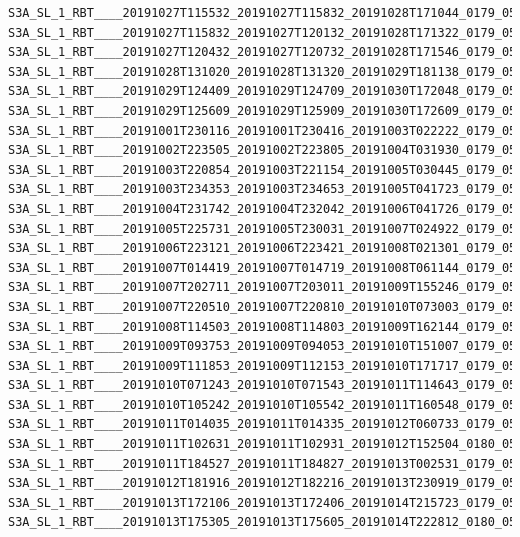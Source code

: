 \documentclass[sigplan,screen]{acmart}
\begin{document}
\begin{verbatim}
S3A_SL_1_RBT____20191027T115532_20191027T115832_20191028T171044_0179_051_009_1800_LN2_O_NT_003.hdf
S3A_SL_1_RBT____20191027T115832_20191027T120132_20191028T171322_0179_051_009_1980_LN2_O_NT_003.hdf
S3A_SL_1_RBT____20191027T120432_20191027T120732_20191028T171546_0179_051_009_2340_LN2_O_NT_003.hdf
S3A_SL_1_RBT____20191028T131020_20191028T131320_20191029T181138_0179_051_024_1800_LN2_O_NT_003.hdf
S3A_SL_1_RBT____20191029T124409_20191029T124709_20191030T172048_0179_051_038_1800_LN2_O_NT_003.hdf
S3A_SL_1_RBT____20191029T125609_20191029T125909_20191030T172609_0179_051_038_2520_LN2_O_NT_003.hdf
S3A_SL_1_RBT____20191001T230116_20191001T230416_20191003T022222_0179_050_030_0900_LN2_O_NT_003.hdf
S3A_SL_1_RBT____20191002T223505_20191002T223805_20191004T031930_0179_050_044_0900_LN2_O_NT_003.hdf
S3A_SL_1_RBT____20191003T220854_20191003T221154_20191005T030445_0179_050_058_0900_LN2_O_NT_003.hdf
S3A_SL_1_RBT____20191003T234353_20191003T234653_20191005T041723_0179_050_059_0540_LN2_O_NT_003.hdf
S3A_SL_1_RBT____20191004T231742_20191004T232042_20191006T041726_0179_050_073_0540_LN2_O_NT_003.hdf
S3A_SL_1_RBT____20191005T225731_20191005T230031_20191007T024922_0179_050_087_0900_LN2_O_NT_003.hdf
S3A_SL_1_RBT____20191006T223121_20191006T223421_20191008T021301_0179_050_101_0900_LN2_O_NT_003.hdf
S3A_SL_1_RBT____20191007T014419_20191007T014719_20191008T061144_0179_050_103_0360_LN2_O_NT_003.hdf
S3A_SL_1_RBT____20191007T202711_20191007T203011_20191009T155246_0179_050_114_1080_LN2_O_NT_003.hdf
S3A_SL_1_RBT____20191007T220510_20191007T220810_20191010T073003_0179_050_115_0900_LN2_O_NT_003.hdf
S3A_SL_1_RBT____20191008T114503_20191008T114803_20191009T162144_0179_050_123_1620_LN2_O_NT_003.hdf
S3A_SL_1_RBT____20191009T093753_20191009T094053_20191010T151007_0179_050_136_1620_LN2_O_NT_003.hdf
S3A_SL_1_RBT____20191009T111853_20191009T112153_20191010T171717_0179_050_137_1620_LN2_O_NT_003.hdf
S3A_SL_1_RBT____20191010T071243_20191010T071543_20191011T114643_0179_050_149_0540_LN2_O_NT_003.hdf
S3A_SL_1_RBT____20191010T105242_20191010T105542_20191011T160548_0179_050_151_1620_LN2_O_NT_003.hdf
S3A_SL_1_RBT____20191011T014035_20191011T014335_20191012T060733_0179_050_160_0360_LN2_O_NT_003.hdf
S3A_SL_1_RBT____20191011T102631_20191011T102931_20191012T152504_0180_050_165_1620_LN2_O_NT_003.hdf
S3A_SL_1_RBT____20191011T184527_20191011T184827_20191013T002531_0179_050_170_1260_LN2_O_NT_003.hdf
S3A_SL_1_RBT____20191012T181916_20191012T182216_20191013T230919_0179_050_184_1260_LN2_O_NT_003.hdf
S3A_SL_1_RBT____20191013T172106_20191013T172406_20191014T215723_0179_050_197_5400_LN2_O_NT_003.hdf
S3A_SL_1_RBT____20191013T175305_20191013T175605_20191014T222812_0180_050_198_1260_LN2_O_NT_003.hdf

\end{verbatim}
\end{document}

